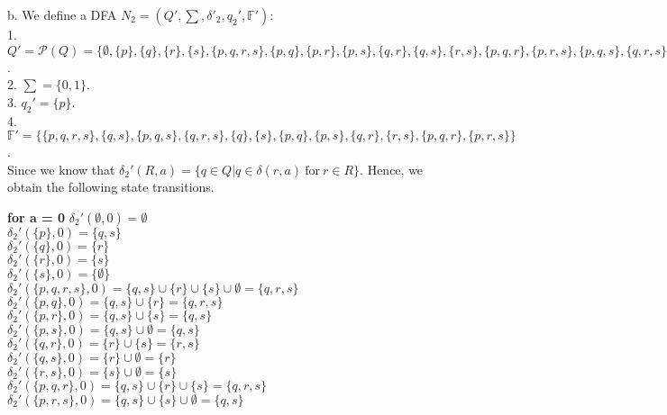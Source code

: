 \documentclass{report}
\begin{document}
{\noindent b. We define a DFA $N_2 = (Q', \sum, \delta'_{2}, q_{2}', \mathds{F}')$:\\
1. $Q' = \mathscr{P}(Q) = \{\emptyset, \{p\}, \{q\}, \{r\}, \{s\}, \{p,q,r,s\}, \{p, q\}, \{p, r\}, \{p, s\}, \{q, r\}, \{q, s\}, \{r, s\}, \{p,q,r\}, \{p,r,s\}, \{p,q,s\}, \{q,r,s\} \}$.\\
2. $\sum = \{ 0,1 \}$.\\
3. $q_{2}' = \{ p \}$.\\
4. $\mathds{F}' = \{ \{ p,q,r,s \} , \{ q,s \}, \{ p,q,s \}, \{ q,r,s \}, \{ q \}, \{ s \}, \{ p,q \}, \{ p,s \}, \{ q,r \}, \{ r,s \}, \{ p,q,r \}, \{ p,r,s \} \}$.\\
Since we know that $\delta_{2}'(R,a) = \{ q \in Q | q \in \delta(r,a) \mathrm{~for~} r \in R \}$. Hence, we obtain the following state transitions.\\
\newline
\begin{minipage}[t]{0.5\textwidth}
      \textbf{for a = 0}\newline
            $\delta_{2}'(\emptyset,0) = \emptyset$\\
            $\delta_{2}'(\{ p \},0) = \{ q, s \}$\\
            $\delta_{2}'(\{ q \},0) = \{ r \}$\\
            $\delta_{2}'(\{ r \},0) = \{ s \}$\\
            $\delta_{2}'(\{ s \},0) = \{ \emptyset \}$\\
            $\delta_{2}'(\{ p,q,r,s \},0) = \{ q, s \} \cup \{ r \} \cup \{ s \} \cup \emptyset = \{ q,r,s \}$\\
            $\delta_{2}'(\{ p,q \},0) = \{ q,s \} \cup \{ r \} = \{ q,r,s \}$\\
            $\delta_{2}'(\{ p,r \},0) = \{ q,s \} \cup \{ s \} = \{ q,s \}$\\
            $\delta_{2}'(\{ p,s \},0) = \{ q,s \} \cup \emptyset = \{ q,s \}$\\
            $\delta_{2}'(\{ q,r \},0) = \{ r \} \cup \{ s \} = \{ r,s \}$\\
            $\delta_{2}'(\{ q,s \},0) = \{ r \} \cup \emptyset = \{ r \}$\\
            $\delta_{2}'(\{ r,s \},0) = \{ s \} \cup \emptyset = \{ s \}$\\
            $\delta_{2}'(\{ p,q,r \},0) = \{ q,s \} \cup \{ r \} \cup \{ s \} = \{ q,r,s \}$\\
            $\delta_{2}'(\{ p,r,s \},0) = \{ q,s \} \cup \{ s \} \cup \emptyset = \{ q,s \}$\\

\end{minipage}}
\end{document}
